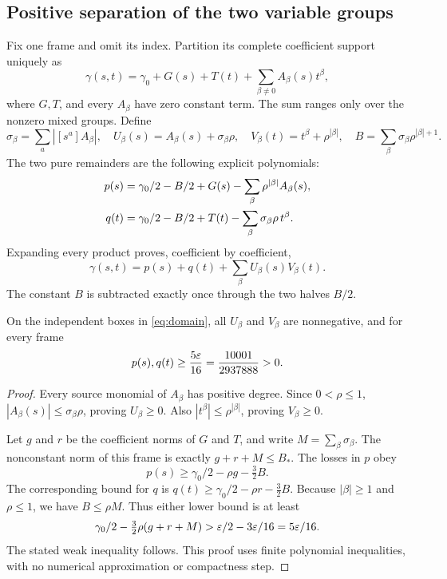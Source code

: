 \subsection{Positive separation of the two variable groups}

Fix one frame and omit its index. Partition its complete coefficient support
uniquely as
\begin{equation}
 \gamma(s,t)=\gamma_0+G(s)+T(t)
              +\sum_{\beta\ne0}A_\beta(s)t^\beta,
 \label{eq:grouping}
\end{equation}
where $G,T$, and every $A_\beta$ have zero constant term. The sum ranges only
over the nonzero mixed groups. Define
\begin{equation}
 \sigma_\beta=\sum_a|[s^a]A_\beta|,\quad
 U_\beta(s)=A_\beta(s)+\sigma_\beta\rho,\quad
 V_\beta(t)=t^\beta+\rho^{|\beta|},\quad
 B=\sum_\beta\sigma_\beta\rho^{|\beta|+1}.
 \label{eq:shifts}
\end{equation}
The two pure remainders are the following explicit polynomials:
\begin{align}
 p(s)&=\gamma_0/2-B/2+G(s)
                -\sum_\beta\rho^{|\beta|}A_\beta(s),\notag\\
 q(t)&=\gamma_0/2-B/2+T(t)
                -\sum_\beta\sigma_\beta\rho\,t^\beta.
 \label{eq:remainders}
\end{align}
Expanding every product proves, coefficient by coefficient,
\begin{equation}
 \gamma(s,t)=p(s)+q(t)+\sum_\beta U_\beta(s)V_\beta(t).
 \label{eq:separation}
\end{equation}
The constant $B$ is subtracted exactly once through the two halves $B/2$.

\begin{lemma}\label{lem:sign}
On the independent boxes in \eqref{eq:domain}, all $U_\beta$ and $V_\beta$
are nonnegative, and for every frame
\begin{equation}
 p(s),q(t)\geq\frac{5\varepsilon}{16}
              =\frac{10001}{2937888}>0.
 \label{eq:remainderbound}
\end{equation}
\end{lemma}
\begin{proof}
Every source monomial of $A_\beta$ has positive degree. Since $0<\rho\leq1$,
$|A_\beta(s)|\leq\sigma_\beta\rho$, proving $U_\beta\geq0$. Also
$|t^\beta|\leq\rho^{|\beta|}$, proving $V_\beta\geq0$.

Let $g$ and $r$ be the coefficient norms of $G$ and $T$, and write
$M=\sum_\beta\sigma_\beta$. The nonconstant norm of this frame is exactly
$g+r+M\leq B_*$. The losses in $p$ obey
\[
 p(s)\geq\gamma_0/2-\rho g-\tfrac32 B.
\]
The corresponding bound for $q$ is
$q(t)\geq\gamma_0/2-\rho r-\tfrac32B$. Because $|\beta|\geq1$ and
$\rho\leq1$, we have $B\leq\rho M$. Thus either lower bound is at least
\[
 \gamma_0/2-\tfrac32\rho(g+r+M)
 >\varepsilon/2-3\varepsilon/16=5\varepsilon/16.
\]
The stated weak inequality follows. This proof uses finite polynomial
inequalities, with no numerical approximation or compactness step.
\end{proof}

